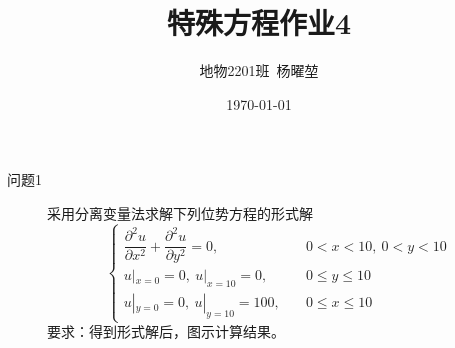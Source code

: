 \documentclass[12pt]{ctexart}
\title{特殊方程作业4}
\author{地物2201班\ 杨曜堃}
\date{\today}
\begin{document}
    \markboth{\theauthor}{\thetitle}
    \maketitle
    \begin{description}
        \item[问题1] 采用分离变量法求解下列位势方程的形式解
        $$
        \begin{cases}
            \dfrac{\partial^2 u}{\partial x^2}+\dfrac{\partial^2 u}{\partial y^2}=0,& \quad 0<x<10,\ 0<y<10\\
            u|_{x=0}=0,\ u|_{x=10}=0,& \quad 0\leqslant y\leqslant 10\\
            u|_{y=0}=0,\ u|_{y=10}=100,& \quad 0\leqslant x\leqslant10
        \end{cases}
        $$
        要求：得到形式解后，图示计算结果。
    \end{description}
\end{document}
